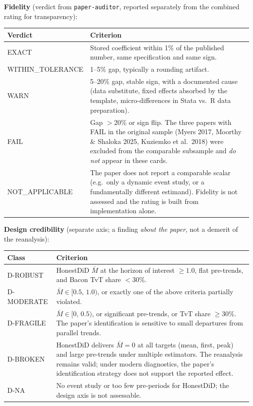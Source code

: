 \noindent\textbf{Fidelity} (verdict from \texttt{paper-auditor}, reported separately from the combined rating for transparency):

\begin{table}[H]
\centering
\footnotesize
\begin{tabularx}{\textwidth}{@{}l X@{}}
\toprule
\textbf{Verdict} & \textbf{Criterion} \\
\midrule
EXACT             & Stored coefficient within 1\% of the published number, same specification and same sign. \\
WITHIN\_TOLERANCE & 1--5\% gap, typically a rounding artifact. \\
WARN              & 5--20\% gap, stable sign, with a documented cause (data substitute, fixed effects absorbed by the template, micro-differences in Stata vs.\ R data preparation). \\
FAIL              & Gap $>$20\% or sign flip. The three papers with FAIL in the original sample (Myers 2017, Moorthy \& Shaloka 2025, Kuziemko et al.\ 2018) were excluded from the comparable subsample and \emph{do not} appear in these cards. \\
NOT\_APPLICABLE   & The paper does not report a comparable scalar (e.g.\ only a dynamic event study, or a fundamentally different estimand). Fidelity is not assessed and the rating is built from implementation alone. \\
\bottomrule
\end{tabularx}
\end{table}

\noindent\textbf{Design credibility} (separate axis; a finding \emph{about the paper}, not a demerit of the reanalysis):

\begin{table}[H]
\centering
\footnotesize
\begin{tabularx}{\textwidth}{@{}l X@{}}
\toprule
\textbf{Class} & \textbf{Criterion} \\
\midrule
D-ROBUST   & HonestDiD $\bar{M}$ at the horizon of interest $\geq 1.0$, flat pre-trends, and Bacon TvT share $<30\%$. \\
D-MODERATE & $\bar{M} \in [0.5,\,1.0)$, or exactly one of the above criteria partially violated. \\
D-FRAGILE  & $\bar{M} \in [0,\,0.5)$, or significant pre-trends, or TvT share $\geq 30\%$. The paper's identification is sensitive to small departures from parallel trends. \\
D-BROKEN   & HonestDiD delivers $\bar{M}=0$ at all targets (mean, first, peak) and large pre-trends under multiple estimators. The reanalysis remains valid; under modern diagnostics, the paper's identification strategy does not support the reported effect. \\
D-NA       & No event study or too few pre-periods for HonestDiD; the design axis is not assessable. \\
\bottomrule
\end{tabularx}
\end{table}

